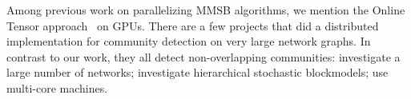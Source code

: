 Among previous work on parallelizing MMSB algorithms, we mention the Online
Tensor approach~\cite{DBLP:journals/corr/HuangNHVA13} on GPUs.
There are a few projects that did a distributed implementation
for community detection on very large network graphs. In contrast to our work,
they all detect non-overlapping communities: \cite{Bu2013246} investigate a
large number of networks; \cite{2015arXiv150302115L} investigate hierarchical
stochastic blockmodels; \cite{Prat-Perez:2014:HQS:2566486.2568010} use
multi-core machines.

\begin{comment}
\subsection{Related work on RDMA Key-Value stores}
In this paper, we describe our custom RDMA D-KV (Distributed Key-Value)
store. Current RMDA D-KV store implementations are RamCloud~\cite{RamCloud},
Pilaf~\cite{Pilaf}, Herd~\cite{Herd} and FaRM~\cite{FaRM}. All these systems
use RDMA to implement a D-KV store. However, all of them are far more powerful
than our custom implementation -- and this power comes at a cost that we
can avoid. They implement a generic D-KV store that controls concurrency,
supports dynamic inserts and deletes, supports variable-sized values
(whose size may change at an update), and keys of arbitrary type. Because
of the nature of our distributed algorithm, we have to deal with none of
these issues. For us, values are fixed-size, allocated only at the initial
population, and remain alive forever. We have no concurrency between writes
and reads or other writes. Our keys are a contiguous range of integers. All
these properties together allow an extremely low-overhead implementation
that does not involve the remote host in any transaction.
\end{comment}
